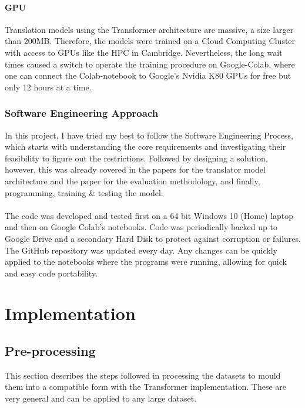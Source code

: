 \documentclass[12pt,a4paper,twoside,openright]{report}
\begin{document}
\subsubsection{GPU}
Translation models using the Transformer architecture are massive, a size larger than 200MB. Therefore, the models were trained on a Cloud Computing Cluster with access to GPUs like the HPC in Cambridge. Nevertheless, the long wait times caused a switch to operate the training procedure on Google-Colab, where one can connect the Colab-notebook to Google's Nvidia K80 GPUs for free but only 12 hours at a time.



\subsection{Software Engineering Approach}
\label{professional-approach}

In this project, I have tried my best to follow the Software Engineering Process, which starts with understanding the core requirements and investigating their feasibility to figure out the restrictions. Followed by designing a solution, however, this was already covered in the papers \cite{transformers} for the translator model architecture and the paper \cite{nguyen-daume-iii-2019-global} for the evaluation methodology, and finally, programming, training \& testing the model.  
\\\\
The code was developed and tested first on a 64 bit Windows 10 (Home) laptop and then on Google Colab's notebooks. Code was periodically backed up to Google Drive and a secondary Hard Disk to protect against corruption or failures. The GitHub repository was updated every day. Any changes can be quickly applied to the notebooks where the programs were running, allowing for quick and easy code portability. 



\chapter{Implementation}
\label{implementation}

\section{Pre-processing}
\label{pre-processing}
This section describes the steps followed in processing the datasets to mould them into a compatible form with the Transformer implementation. These are very general and can be applied to any large dataset. 
\end{document}
